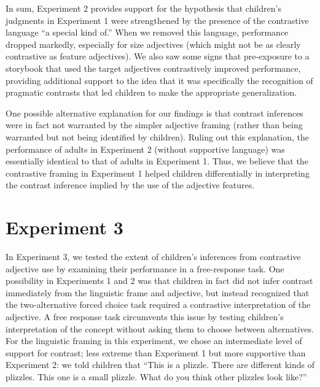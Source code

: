 \documentclass[man]{apa2}
\begin{document}
In sum, Experiment 2 provides support for the hypothesis that children's judgments in Experiment 1 were strengthened by the presence of the contrastive language ``a special kind of.'' When we removed this language, performance dropped markedly, especially for size adjectives (which might not be as clearly contrastive as feature adjectives). We also saw some signs that pre-exposure to a storybook that used the target adjectives contrastively improved performance, providing additional support to the idea that it was specifically the recognition of pragmatic contrasts that led children to make the appropriate generalization. 

One possible alternative explanation for our findings is that contrast inferences were in fact not warranted by the simpler adjective framing (rather than being warranted but not being identified by children). Ruling out this explanation, the performance of adults in Experiment 2 (without supportive language) was essentially identical to that of adults in Experiment 1. Thus, we believe that the contrastive framing in Experiment 1 helped children differentially in interpreting the contrast inference implied by the use of the adjective features. 

\section{Experiment 3} 


In Experiment 3, we tested the extent of children's inferences from contrastive adjective use by examining their performance in a free-response task. One possibility in Experiments 1 and 2 was that children in fact did not infer contrast immediately from the linguistic frame and adjective, but instead recognized that the two-alternative forced choice task required a contrastive interpretation of the adjective. A free response task circumvents this issue by testing children's interpretation of the concept without asking them to choose between alternatives. For the linguistic framing in this experiment, we chose an intermediate level of support for contrast; less extreme than Experiment 1 but more supportive than Experiment 2: we told children that ``This is a plizzle. There are different kinds of plizzles. This one is a small plizzle. What do you think other plizzles look like?'' 
\end{document}
